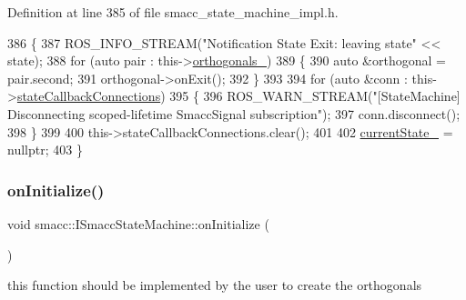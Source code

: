 Definition at line 385 of file smacc\+\_\+state\+\_\+machine\+\_\+impl.\+h.


\begin{DoxyCode}
386 \{
387     ROS\_INFO\_STREAM(\textcolor{stringliteral}{"Notification State Exit: leaving state"} << state);
388     \textcolor{keywordflow}{for} (\textcolor{keyword}{auto} pair : this->\hyperlink{classsmacc_1_1ISmaccStateMachine_acc5944f313bc6ce1637c632243a511f2}{orthogonals\_})
389     \{
390         \textcolor{keyword}{auto} &orthogonal = pair.second;
391         orthogonal->onExit();
392     \}
393 
394     \textcolor{keywordflow}{for} (\textcolor{keyword}{auto} &conn : this->\hyperlink{classsmacc_1_1ISmaccStateMachine_aaf98bb0edaa5d8c84767e4acfad3548d}{stateCallbackConnections})
395     \{
396         ROS\_WARN\_STREAM(\textcolor{stringliteral}{"[StateMachine] Disconnecting scoped-lifetime SmaccSignal subscription"});
397         conn.disconnect();
398     \}
399 
400     this->stateCallbackConnections.clear();
401 
402     \hyperlink{classsmacc_1_1ISmaccStateMachine_a9c6e7745205bcce80a301f2fbe8f7e99}{currentState\_} = \textcolor{keyword}{nullptr};
403 \}
\end{DoxyCode}
\mbox{\label{classsmacc_1_1ISmaccStateMachine_ac2982c6c8283663e5e1e8a7c82f511ec}} 
\subsubsection{\texorpdfstring{on\+Initialize()}{onInitialize()}}
{\footnotesize\ttfamily void smacc\+::\+I\+Smacc\+State\+Machine\+::on\+Initialize (\begin{DoxyParamCaption}{ }\end{DoxyParamCaption})\hspace{0.3cm}{\ttfamily [virtual]}}



this function should be implemented by the user to create the orthogonals 



